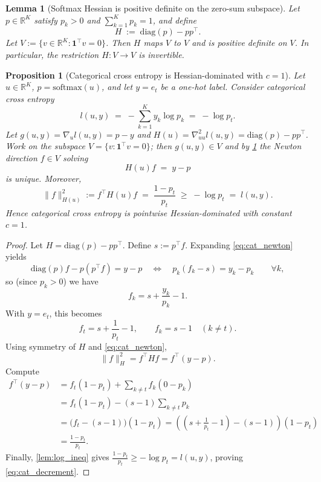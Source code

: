 \documentclass[10pt,a4paper]{amsart}
\newtheorem{lemma}{Lemma}
\newtheorem{proposition}{Proposition}
\begin{document}
\begin{lemma}[Softmax Hessian is positive definite on the zero-sum subspace]
\label{lem:softmax_hess_posdef}
Let $p\in\mathbb{R}^K$ satisfy $p_k>0$ and $\sum_{k=1}^K p_k=1$, and define
\[
H \;:=\; \mathrm{diag}(p)-pp^\top.
\]
Let $V:=\{v\in\mathbb{R}^K:\mathbf{1}^\top v=0\}$. Then $H$ maps $V$ to $V$ and is
positive definite on $V$. In particular, the restriction $H:V\to V$ is invertible.
\end{lemma}

\begin{proposition}[Categorical cross entropy is Hessian-dominated with $c=1$]
\label{prop:categorical_ce_hessdom}
Let $u\in\mathbb{R}^K$, $p=\mathrm{softmax}(u)$, and let $y=e_t$ be a one-hot label.
Consider categorical cross entropy
\[
l(u,y) \;=\; -\sum_{k=1}^K y_k\log p_k \;=\; -\log p_t.
\]
Let $g(u,y)=\nabla_u l(u,y)=p-y$ and $H(u)=\nabla^2_{uu}l(u,y)=\mathrm{diag}(p)-pp^\top$.
Work on the subspace $V=\{v:\mathbf{1}^\top v=0\}$; then $g(u,y)\in V$ and by
\cref{lem:softmax_hess_posdef} the Newton direction $f\in V$ solving
\begin{equation}
\label{eq:cat_newton}
H(u)f \;=\; y-p
\end{equation}
is unique. Moreover,
\begin{equation}
\label{eq:cat_decrement}
\|f\|_{H(u)}^2 := f^\top H(u)f
\;=\; \frac{1-p_t}{p_t}
\;\ge\; -\log p_t \;=\; l(u,y).
\end{equation}
Hence categorical cross entropy is pointwise Hessian-dominated with constant $c=1$.
\end{proposition}

\begin{proof}
Let $H=\mathrm{diag}(p)-pp^\top$. Define $s:=p^\top f$. Expanding \eqref{eq:cat_newton} yields
\[
\mathrm{diag}(p)f - p(p^\top f)=y-p
\quad\Longleftrightarrow\quad
p_k(f_k-s)=y_k-p_k\qquad \forall k,
\]
so (since $p_k>0$) we have
\[
f_k = s + \frac{y_k}{p_k} - 1.
\]
With $y=e_t$, this becomes
\[
f_t = s + \frac{1}{p_t}-1,\qquad f_k=s-1\quad(k\neq t).
\]
Using symmetry of $H$ and \eqref{eq:cat_newton},
\[
\|f\|_H^2=f^\top H f = f^\top (y-p).
\]
Compute
\begin{align*}
f^\top (y-p)
&= f_t(1-p_t) + \sum_{k\neq t} f_k(0-p_k) \\
&= f_t(1-p_t) - (s-1)\sum_{k\neq t}p_k \\
&= \big(f_t-(s-1)\big)(1-p_t)
= \left(\left(s+\frac{1}{p_t}-1\right)-(s-1)\right)(1-p_t) \\
&= \frac{1-p_t}{p_t}.
\end{align*}
Finally, \cref{lem:log_ineq} gives $\frac{1-p_t}{p_t}\ge -\log p_t=l(u,y)$,
proving \eqref{eq:cat_decrement}.
\end{proof}
\end{document}
